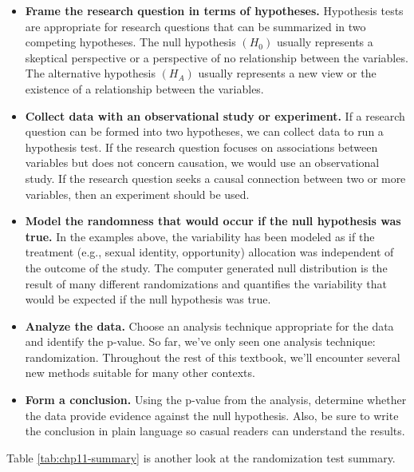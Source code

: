 \documentclass[
  10pt,
  openany]{book}
\providecommand{\tightlist}{%
  \setlength{\itemsep}{0pt}\setlength{\parskip}{0pt}}
\begin{document}
\begin{itemize}
\tightlist
\item
  \textbf{Frame the research question in terms of hypotheses.} Hypothesis tests are appropriate for research questions that can be summarized in two competing hypotheses. The null hypothesis \((H_0)\) usually represents a skeptical perspective or a perspective of no relationship between the variables. The alternative hypothesis \((H_A)\) usually represents a new view or the existence of a relationship between the variables.
\item
  \textbf{Collect data with an observational study or experiment.} If a research question can be formed into two hypotheses, we can collect data to run a hypothesis test. If the research question focuses on associations between variables but does not concern causation, we would use an observational study. If the research question seeks a causal connection between two or more variables, then an experiment should be used.
\item
  \textbf{Model the randomness that would occur if the null hypothesis was true.} In the examples above, the variability has been modeled as if the treatment (e.g., sexual identity, opportunity) allocation was independent of the outcome of the study. The computer generated null distribution is the result of many different randomizations and quantifies the variability that would be expected if the null hypothesis was true.
\item
  \textbf{Analyze the data.} Choose an analysis technique appropriate for the data and identify the p-value. So far, we've only seen one analysis technique: randomization. Throughout the rest of this textbook, we'll encounter several new methods suitable for many other contexts.
\item
  \textbf{Form a conclusion.} Using the p-value from the analysis, determine whether the data provide evidence against the null hypothesis. Also, be sure to write the conclusion in plain language so casual readers can understand the results.
\end{itemize}

Table \ref{tab:chp11-summary} is another look at the randomization test summary.
\end{document}
